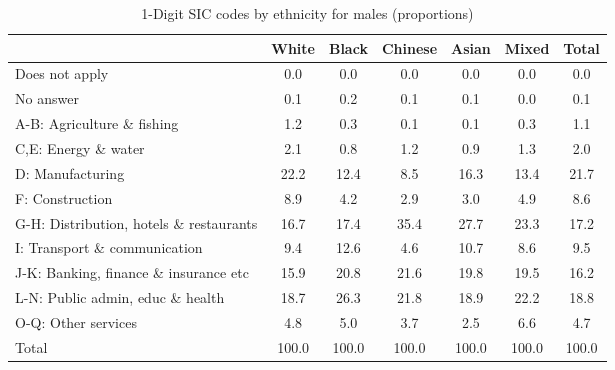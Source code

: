 \begin{table}[htbp]\centering
\def\sym#1{\ifmmode^{#1}\else\(^{#1}\)\fi}
\caption{1-Digit SIC codes by ethnicity for males (proportions)}
\begin{tabular}{l*{6}{c}}
\hline\hline
          &    White&    Black&  Chinese&    Asian&    Mixed&    Total\\
\hline
Does not apply&      0.0&      0.0&      0.0&      0.0&      0.0&      0.0\\
No answer &      0.1&      0.2&      0.1&      0.1&      0.0&      0.1\\
A-B: Agriculture \& fishing&      1.2&      0.3&      0.1&      0.1&      0.3&      1.1\\
C,E: Energy \& water&      2.1&      0.8&      1.2&      0.9&      1.3&      2.0\\
D: Manufacturing&     22.2&     12.4&      8.5&     16.3&     13.4&     21.7\\
F: Construction&      8.9&      4.2&      2.9&      3.0&      4.9&      8.6\\
G-H: Distribution, hotels \& restaurants&     16.7&     17.4&     35.4&     27.7&     23.3&     17.2\\
I: Transport \& communication&      9.4&     12.6&      4.6&     10.7&      8.6&      9.5\\
J-K: Banking, finance \& insurance etc&     15.9&     20.8&     21.6&     19.8&     19.5&     16.2\\
L-N: Public admin, educ \& health&     18.7&     26.3&     21.8&     18.9&     22.2&     18.8\\
O-Q: Other services&      4.8&      5.0&      3.7&      2.5&      6.6&      4.7\\
Total     &    100.0&    100.0&    100.0&    100.0&    100.0&    100.0\\
\hline\hline
\end{tabular}
\label{tab:1D_industries_male}
\end{table}

